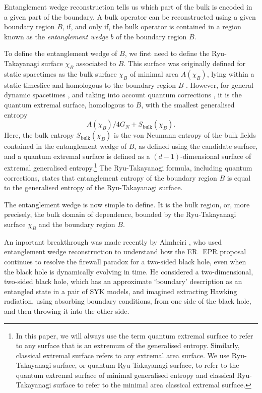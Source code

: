 \documentclass[11pt,a4paper]{article}
\begin{document}
Entanglement wedge reconstruction tells us which part of the bulk is encoded in a given part of the boundary. A bulk operator can be reconstructed using a given boundary region $B$, if, and only if, the bulk operator is contained in a region known as the \emph{entanglement wedge} $b$ of the boundary region $B$. 

To define the entanglement wedge of $B$, we first need to define the Ryu-Takayanagi surface $\chi_B$ associated to $B$. This surface was originally defined for static spacetimes as the bulk surface $\chi_B$ of minimal area $A(\chi_B)$, lying within a static timeslice and homologous to the boundary region $B$ \cite{ryu2006holographic, headrick2007holographic}. However, for general dynamic spacetimes \cite{hubeny2007covariant}, and taking into account quantum corrections \cite{engelhardt2015quantum,dong2018entropy}, it is the quantum extremal surface, homologous to $B$, with the smallest generalised entropy $$A(\chi_B)/4G_N + S_\text{bulk}(\chi_B).$$ 
Here, the bulk entropy $S_\text{bulk}(\chi_B)$ is the von Neumann entropy of the bulk fields contained in the entanglement wedge of $B$, as defined using the candidate surface, and a quantum extremal surface is defined as a $(d-1)$-dimensional surface of extremal generalised entropy.\footnote{In this paper, we will always use the term quantum extremal surface to refer to any surface that is an extremum of the generalised entropy. Similarly, classical extremal surface refers to any extremal area surface. We use Ryu-Takayanagi surface, or quantum Ryu-Takayanagi surface, to refer to the quantum extremal surface of minimal generalised entropy and classical Ryu-Takayanagi surface to refer to the minimal area classical extremal surface.} The Ryu-Takayanagi formula, including quantum corrections, states that entanglement entropy of the boundary region $B$ is equal to the generalised entropy of the Ryu-Takayanagi surface. 

The entanglement wedge is now simple to define. It is the bulk region, or, more precisely, the bulk domain of dependence, bounded by the Ryu-Takayanagi surface $\chi_B$ and the boundary region $B$.

An inportant breakthrough was made recently by Almheiri \cite{almheiri2018holographic}, who used entanglement wedge reconstruction to understand how the ER=EPR proposal continues to resolve the firewall paradox for a two-sided black hole, even when the black hole is dynamically evolving in time. He considered a two-dimensional, two-sided black hole, which has an approximate `boundary' description as an entangled state in a pair of SYK models, and imagined extracting Hawking radiation, using absorbing boundary conditions, from one side of the black hole, and then throwing it into the other side. 
\end{document}
